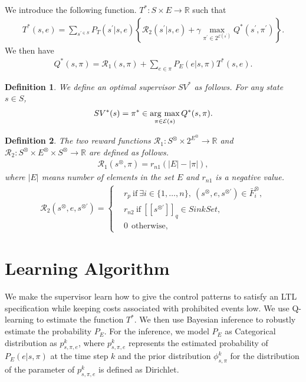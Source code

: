 \documentclass[letterpaper, 10 pt, conference, dvipdfmx]{ieeeconf}
\newtheorem{definition}{Definition}
\newcommand{\myspdq}{\ensuremath{[\![s^{\otimes \prime}]\!]}_q}
\newcommand{\argmax}{\mathop{\rm arg~max}\limits}
\begin{document}
We introduce the following function. $T^{\ast} : S \times E \rightarrow \mathbb{R}$ such that
\begin{align}
  T^{\ast}(s,e) = \sum_{s^{\prime \in S}} P_T(s^{\prime}|s,e) \left \{ \mathcal{R}_2(s^{\prime}|s,e) + \gamma \max_{\pi^{\prime} \in 2^{\mathcal{E}(s^{\prime})}} Q^{\ast}(s^{\prime}, \pi^{\prime}) \right \}.
\end{align}
We then have
\begin{align}
  Q^{\ast}(s,\pi) = \mathcal{R}_1(s,\pi) + \sum_{e \in \pi}P_E(e|s,\pi) T^{\ast}(s,e).
\end{align}
\begin{definition}
We define an optimal supervisor $SV^{\ast}$ as follows. For any state $s \in S$,
\begin{align}
  SV^{\ast}(s) = \pi^{\ast} \in \argmax_{\pi \in \mathcal{E}(s)} Q^{\ast}(s,\pi).
\end{align}
\end{definition}

\begin{definition}
  The two reward functions $\mathcal{R}_1 : S^{\otimes} \times 2^{E^{\otimes}} \rightarrow \mathbb{R}$ and $\mathcal{R}_2 : S^{\otimes} \times E^{\otimes} \times S^{\otimes} \rightarrow \mathbb{R}$ are defined as follows.
  \begin{align}
    \mathcal{R}_1 (s^{\otimes}, \pi) = r_{n1} (|E|-|\pi|),
  \end{align}
  where $|E|$ means number of elements in the set $E$ and $r_{n1}$ is a negative value.
  \begin{align}
    \mathcal{R}_2(s^{\otimes}, e, s^{\otimes \prime}) =
    \left\{
    \begin{aligned}
      &r_p \  \text{if}\ \exists i \in \! \{ 1, \ldots ,n \},\ (s^{\otimes}, e, s^{\otimes \prime}) \in \bar{F}^{\otimes}_i \!,\\
      &r_{n2} \ \text{if}\ \myspdq \in SinkSet,\\
      &0   \ \ \text{otherwise},
    \end{aligned}
    \right.
  \end{align}
\end{definition}
\section{Learning Algorithm}
We make the supervisor learn how to give the control patterns to satisfy an LTL specification while keeping costs associated with prohibited events low. We use Q-learning to estimate the function $T^{\ast}$. We then use Bayesian inference to robustly estimate the probability $P_E$. For the inference, we model $P_E$ as Categorical distribution as $p^k_{s,\pi,e}$, where $p^k_{s,\pi,e}$ represents the estimated probability of $P_E(e|s,\pi)$ at the time step $k$ and the prior distribution $\phi^k_{s,\pi}$ for the distribution of the parameter of $p^k_{s,\pi,e}$ is defined as Dirichlet.
\end{document}
